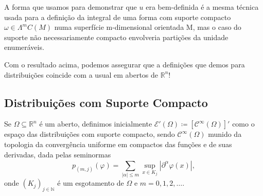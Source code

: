 \documentclass[../distribution_theory_notes.tex]{subfiles}
\begin{document}
\begin{tcolorbox}[
		skin=enhanced,
		title=Observação,
		fonttitle=\bfseries,
		colframe=black,
		colbacktitle=cyan!75!white,
		colback=cyan!15,
		colbacklower=black,
		coltitle=black,
		drop fuzzy shadow,
	]
	A forma que usamos para demonstrar que \(u\) era bem-definida é a mesma técnica usada para a definição da integral de uma forma com suporte compacto \(\omega \in \Lambda^{m}C(M)\) numa superfície m-dimensional orientada M, mas o caso do suporte não necessariamente compacto envolveria partições da unidade enumeráveis.
\end{tcolorbox}
Com o resultado acima, podemos assegurar que a definições que demos para distribuições coincide com a usual em abertos de \(\mathbb{R}^{n}\)!
\subsection{Distribuições com Suporte Compacto}
Se \(\Omega \subseteq \mathbb{R}^{n}\) é um aberto, definimos inicialmente \(\mathcal{E}'(\Omega ) \coloneqq [\mathcal{C}^{\infty}(\Omega )]'\) como o espaço das distribuições com suporte compacto, sendo \(\mathcal{C}^{\infty}(\Omega )\) munido da topologia da convergência uniforme em compactos das funções e de suas derivadas, dada pelas seminormas
\[
	p_{(m, j)}(\varphi ) = \sum\limits_{| \alpha  |\leq m}^{}\sup_{x\in K_{j}}| \partial ^{\alpha }\varphi (x) |,
\]
onde \((K_{j})_{j\in \mathbb{N}}\) é um esgotamento de \(\Omega \) e \(m=0, 1, 2, \dotsc \).
\end{document}
